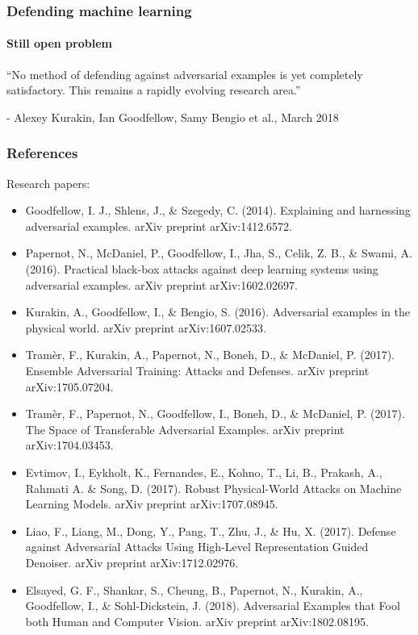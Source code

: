 \documentclass[9pt]{beamer}
\begin{document}
\begin{frame}

  \frametitle{Defending machine learning}

  \framesubtitle{Still open problem}

  ``No method of defending against adversarial examples is yet
  completely satisfactory. This remains a rapidly evolving research
  area.''

  \bigskip

  - Alexey Kurakin, Ian Goodfellow, Samy Bengio et al., March 2018
\end{frame}

\begin{frame}
  \frametitle{References}

  Research papers:
  {\footnotesize
    \begin{itemize}
    \item Goodfellow, I. J., Shlens, J., \& Szegedy,
      C. (2014). Explaining and harnessing adversarial
      examples. arXiv preprint arXiv:1412.6572.
    \item Papernot, N., McDaniel, P., Goodfellow, I., Jha, S., Celik,
      Z. B., \& Swami, A. (2016). Practical black-box attacks against
      deep learning systems using adversarial examples. arXiv preprint
      arXiv:1602.02697.
    \item Kurakin, A., Goodfellow, I., \& Bengio,
      S. (2016). Adversarial examples in the physical world. arXiv
      preprint arXiv:1607.02533.
    \item Tramèr, F., Kurakin, A., Papernot, N., Boneh, D., \&
      McDaniel, P. (2017). Ensemble Adversarial Training: Attacks and
      Defenses. arXiv preprint arXiv:1705.07204.
    \item Tramèr, F., Papernot, N., Goodfellow, I., Boneh, D., \&
      McDaniel, P. (2017). The Space of Transferable Adversarial
      Examples. arXiv preprint arXiv:1704.03453.
    \item Evtimov, I., Eykholt, K., Fernandes, E., Kohno, T., Li, B.,
      Prakash, A., Rahmati A. \& Song, D. (2017). Robust Physical-World
      Attacks on Machine Learning Models. arXiv preprint
      arXiv:1707.08945.
    \item Liao, F., Liang, M., Dong, Y., Pang, T., Zhu, J., \& Hu,
      X. (2017). Defense against Adversarial Attacks Using High-Level
      Representation Guided Denoiser. arXiv preprint arXiv:1712.02976.
    \item Elsayed, G. F., Shankar, S., Cheung, B., Papernot, N.,
      Kurakin, A., Goodfellow, I., \& Sohl-Dickstein,
      J. (2018). Adversarial Examples that Fool both Human and
      Computer Vision. arXiv preprint arXiv:1802.08195.
    \end{itemize}
  }


\end{frame}
\end{document}
